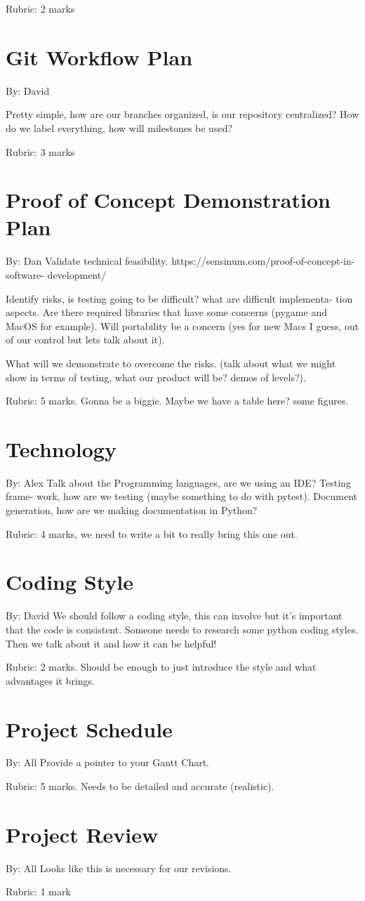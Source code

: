 \documentclass{article}
\begin{document}
Rubric:  2 marks

\section{Git Workflow Plan}
By: David

Pretty  simple,  how  are  our  branches  organized,  is  our  repository  
centralized?
How do we label everything, how will milestones be used?

Rubric:  3 marks

\section{Proof of Concept Demonstration Plan}
By: Dan
Validate technical feasibility.  
https://sensinum.com/proof-of-concept-in-software-
development/

Identify risks, is testing going to be difficult?  what are difficult 
implementa-
tion aspects.  Are there required libraries that have some concerns (pygame and
MacOS for example).  Will portability be a concern (yes for new Macs I guess,
out  of our control but lets talk about it).

What will we demonstrate to overcome the risks.  (talk about what we might
show in terms of testing, what our product will be?  demos of levels?).

Rubric:  5  marks.   Gonna  be  a  biggie.   Maybe  we  have  a  table  here?   
some figures.

\section{Technology}
By: Alex
Talk  about  the  Programming  languages,  are  we  using  an  IDE?  Testing  
frame-
work,  how  are  we  testing  (maybe  something  to  do  with  pytest).   
Document
generation, how are we making documentation in Python?

Rubric:  4 marks, we need to write a bit to really bring this one out.

\section{Coding Style}
By: David
We  should  follow  a  coding  style,  this  can  involve  but  it’s  important 
 that  the
code is consistent.  Someone needs to research some python coding styles.  Then
we talk about it and how it can be helpful!

Rubric:  2  marks.   Should  be  enough  to  just  introduce  the  style  and  
what
advantages it brings.

\section{Project Schedule}
By: All
Provide a pointer to your Gantt Chart.

Rubric:  5 marks.  Needs to be detailed and accurate (realistic).

\section{Project Review}
By: All
Looks like this is necessary for our revisions.

Rubric:  1 mark
\end{document}
